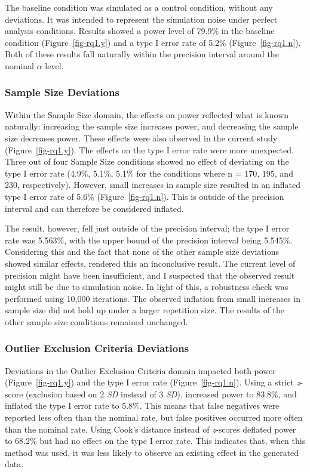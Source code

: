 \documentclass[
  man,
  floatsintext,
  longtable,
  nolmodern,
  notxfonts,
  notimes,
  colorlinks=true,linkcolor=blue,citecolor=blue,urlcolor=blue]{apa7}
\begin{document}
The baseline condition was simulated as a control condition, without any
deviations. It was intended to represent the simulation noise under
perfect analysis conditions. Results showed a power level of 79.9\% in
the baseline condition (Figure~\ref{fig-rq1.y}) and a type I error rate
of 5.2\% (Figure~\ref{fig-rq1.n}). Both of these results fall naturally
within the precision interval around the nominal \(\alpha\) level.

\subsubsection{Sample Size Deviations}\label{sample-size-deviations-1}

Within the Sample Size domain, the effects on power reflected what is
known naturally: increasing the sample size increases power, and
decreasing the sample size decreases power. These effects were also
observed in the current study (Figure~\ref{fig-rq1.y}). The effects on
the type I error rate were more unexpected. Three out of four Sample
Size conditions showed no effect of deviating on the type I error rate
(4.9\%, 5.1\%, 5.1\% for the conditions where n = 170, 195, and 230,
respectively). However, small increases in sample size resulted in an
inflated type I error rate of 5.6\% (Figure~\ref{fig-rq1.n}). This is
outside of the precision interval and can therefore be considered
inflated.

The result, however, fell just outside of the precision interval; the
type I error rate was 5.563\%, with the upper bound of the precision
interval being 5.545\%. Considering this and the fact that none of the
other sample size deviations showed similar effects, rendered this an
inconclusive result. The current level of precision might have been
insufficient, and I suspected that the observed result might still be
due to simulation noise. In light of this, a robustness check was
performed using 10,000 iterations. The observed inflation from small
increases in sample size did not hold up under a larger repetition size.
The results of the other sample size conditions remained unchanged.

\subsubsection{Outlier Exclusion Criteria
Deviations}\label{outlier-exclusion-criteria-deviations-1}

Deviations in the Outlier Exclusion Criteria domain impacted both power
(Figure~\ref{fig-rq1.y}) and the type I error rate
(Figure~\ref{fig-rq1.n}). Using a strict \emph{z}-score (exclusion based
on 2 \emph{SD} instead of 3 \emph{SD}), increased power to 83.8\%, and
inflated the type I error rate to 5.8\%. This means that false negatives
were reported less often than the nominal rate, but false positives
occurred more often than the nominal rate. Using Cook's distance instead
of \emph{z}-scores deflated power to 68.2\% but had no effect on the
type I error rate. This indicates that, when this method was used, it
was less likely to observe an existing effect in the generated data.
\end{document}
